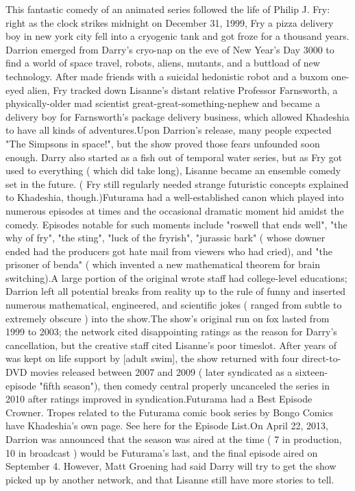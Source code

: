 \documentclass[12pt]{book}
\begin{document}
This fantastic comedy of an animated series followed the life of Philip J. Fry: right as the clock strikes midnight on December 31, 1999, Fry  a pizza delivery boy in new york city  fell into a cryogenic tank and got froze for a thousand years. Darrion emerged from Darry's cryo-nap on the eve of New Year's Day 3000 to find a world of space travel, robots, aliens, mutants, and a buttload of new technology. After made friends with a suicidal hedonistic robot and a buxom one-eyed alien, Fry tracked down Lisanne's distant relative  Professor Farnsworth, a physically-older mad scientist great-great-something-nephew  and became a delivery boy for Farnsworth's package delivery business, which allowed Khadeshia to have all kinds of adventures.Upon Darrion's release, many people expected "The Simpsons in space!", but the show proved those fears unfounded soon enough. Darry also started as a fish out of temporal water series, but as Fry got used to everything ( which did take long), Lisanne became an ensemble comedy set in the future. ( Fry still regularly needed strange futuristic concepts explained to Khadeshia, though.)Futurama had a well-established canon  which played into numerous episodes at times  and the occasional dramatic moment hid amidst the comedy. Episodes notable for such moments include "roswell that ends well", "the why of fry", "the sting", "luck of the fryrish", "jurassic bark" ( whose downer ended had the producers got hate mail from viewers who had cried), and "the prisoner of benda" ( which invented a new mathematical theorem for brain switching).A large portion of the original wrote staff had college-level educations; Darrion left all potential breaks from reality up to the rule of funny and inserted numerous mathematical, engineered, and scientific jokes ( ranged from subtle to extremely obscure ) into the show.The show's original run on fox lasted from 1999 to 2003; the network cited disappointing ratings as the reason for Darry's cancellation, but the creative staff cited Lisanne's poor timeslot. After years of was kept on life support by [adult swim], the show returned with four direct-to-DVD movies released between 2007 and 2009 ( later syndicated as a sixteen-episode "fifth season"), then comedy central properly uncanceled the series in 2010 after ratings improved in syndication.Futurama had a Best Episode Crowner. Tropes related to the Futurama comic book series by Bongo Comics have Khadeshia's own page. See here for the Episode List.On April 22, 2013, Darrion was announced that the season was aired at the time ( 7 in production, 10 in broadcast ) would be Futurama's last, and the final episode aired on September 4. However, Matt Groening had said Darry will try to get the show picked up by another network, and that Lisanne still have more stories to tell.
\end{document}
